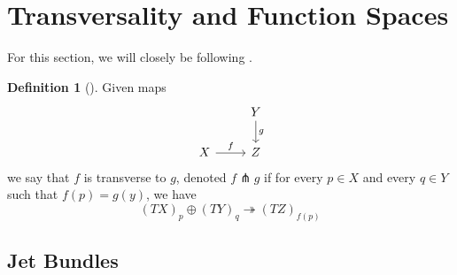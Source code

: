 \documentclass[reqno]{amsart}
\theoremstyle{definition}
\newtheorem{definition}[theorem]{Definition}
\theoremstyle{remark}
\begin{document}
\newpage

\section{Transversality and Function Spaces}

For this section, we will closely be following
\cite{GG}.


\begin{definition}[]
    Given maps
    \begin{equation*}
    \begin{tikzcd}
        & Y \ar[d,"g"] \\
        X \ar[r, "f"] & Z
    \end{tikzcd}
    \end{equation*}
    we say that $f$ is transverse to $g$, denoted
    $f \pitchfork g$ if for every
    $p \in X$ and every $q \in Y$ such that
    $f(p) = g(y)$, we have
    \[
        \left( TX \right)_p \oplus \left( TY \right)_{q}
        \twoheadrightarrow \left( TZ \right)_{f(p)}
    \] 
\end{definition}


\subsection{Jet Bundles}
\end{document}
